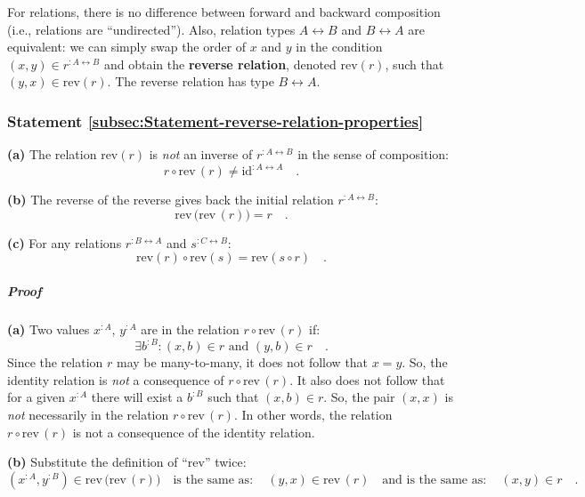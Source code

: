 For relations, there is no difference between forward and backward
composition (i.e., relations are \textsf{``}undirected\textsf{''}). Also, relation
types $A\leftrightarrow B$ and $B\leftrightarrow A$ are equivalent:
we can simply swap the order of $x$ and $y$ in the condition $(x,y)\in r^{:A\leftrightarrow B}$
and obtain the \textbf{reverse relation},
denoted $\text{rev}\left(r\right)$, such that $(y,x)\in\text{rev}\left(r\right)$.
The reverse relation has type $B\leftrightarrow A$.

\subsubsection{Statement \label{subsec:Statement-reverse-relation-properties}\ref{subsec:Statement-reverse-relation-properties}}

\textbf{(a)} The relation $\text{rev}(r)$ is \emph{not} an inverse
of $r^{:A\leftrightarrow B}$ in the sense of composition:
\[
r\circ\text{rev}\,(r)\neq\text{id}^{:A\leftrightarrow A}\quad.
\]

\textbf{(b)} The reverse of the reverse gives back the initial relation
$r^{:A\leftrightarrow B}$:
\[
\text{rev}\,\big(\text{rev}\,(r)\big)=r\quad.
\]

\textbf{(c)} For any relations $r^{:B\leftrightarrow A}$ and $s^{:C\leftrightarrow B}$:
\[
\text{rev}\left(r\right)\circ\text{rev}\left(s\right)=\text{rev}\left(s\circ r\right)\quad.
\]


\subparagraph{Proof}

\textbf{(a)} Two values $x^{:A}$, $y^{:A}$ are in the relation $r\circ\text{rev}\,(r)$
if:
\[
\exists b^{:B}:(x,b)\in r\text{ and }(y,b)\in r\quad.
\]
Since the relation $r$ may be many-to-many, it does not follow that
$x=y$. So, the identity relation is \emph{not} a consequence of $r\circ\text{rev}\,(r)$.
It also does not follow that for a given $x^{:A}$ there will exist
a $b^{:B}$ such that $(x,b)\in r$. So, the pair $\left(x,x\right)$
is \emph{not} necessarily in the relation $r\circ\text{rev}\,(r)$.
In other words, the relation $r\circ\text{rev}\,(r)$ is not a consequence
of the identity relation.

\textbf{(b)} Substitute the definition of \textsf{``}$\text{rev}$\textsf{''} twice:
\[
(x^{:A},y^{:B})\in\text{rev}\,\big(\text{rev}\,(r)\big)\quad\text{is the same as}:\quad(y,x)\in\text{rev}\,(r)\quad\text{and is the same as}:\quad(x,y)\in r\quad.
\]

